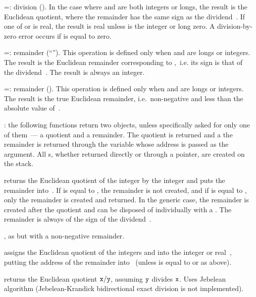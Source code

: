 \op=: division (). In the case where  and 
are both integers or longs, the result is the Euclidean quotient, where the
remainder has the same sign as the dividend~. If one of  or
 is real, the result is real unless  is the integer or long
zero. A division-by-zero error occurs if  is equal to zero.

\op=: remainder (``''). This operation is defined only
when  and  are longs or integers. The result is the Euclidean
remainder corresponding to ,~i.e. its sign is that of the
dividend~. The result is always an integer.

\op=: remainder (). This operation is defined only when
 and  are longs or integers. The result is the true Euclidean
remainder, i.e.~non-negative and less than the absolute value of~.

: the following functions return two objects,
unless specifically asked for only one of them~--- a quotient and a remainder.
The quotient is returned and a the remainder is returned through the variable
whose address is passed as the  argument. All s, whether
returned directly or through a pointer, are created on the stack.

 returns the Euclidean quotient of the
integer  by the integer  and puts the remainder into~.
If  is equal to , the remainder is not created, and if
 is equal to  , only the remainder is created and
returned. In the generic case, the remainder is created after the quotient
and can be disposed of individually with a . The remainder is
always of the sign of the dividend~.

, as  but with a
non-negative remainder.

 assigns the Euclidean
quotient of the integers  and  into the integer or
real~, putting the address of the remainder into~ (unless
 is equal to  or  as above).

 returns the Euclidean quotient ${\tt x}
/ {\tt y}$, assuming ${\tt y}$ divides ${\tt x}$. Uses Jebelean algorithm
(Jebelean-Krandick bidirectional exact division is not implemented).

